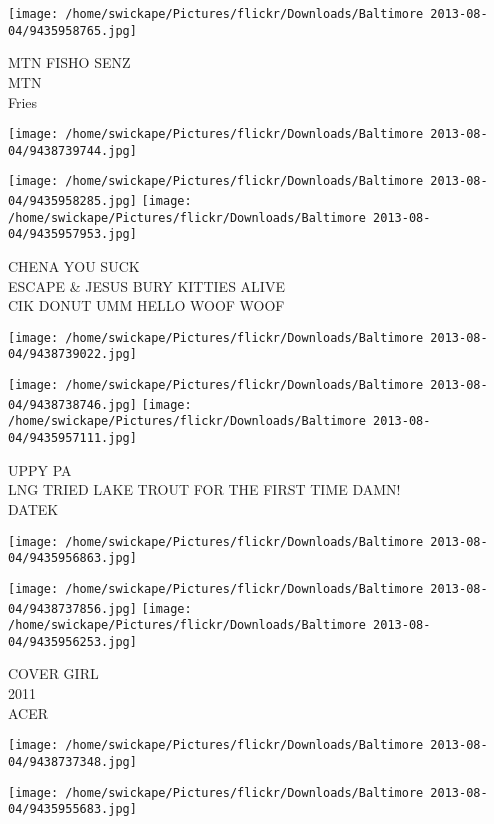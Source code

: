\documentclass[10pt,letterpaper]{article}
\begin{document}
\vspace{0.25in}
\texttt{[image: /home/swickape/Pictures/flickr/Downloads/Baltimore 2013-08-04/9435958765.jpg]}

MTN FISHO SENZ\\
MTN\\
Fries
\pagebreak

\texttt{[image: /home/swickape/Pictures/flickr/Downloads/Baltimore 2013-08-04/9438739744.jpg]}

\vspace{0.25in}
\texttt{[image: /home/swickape/Pictures/flickr/Downloads/Baltimore 2013-08-04/9435958285.jpg]}
\texttt{[image: /home/swickape/Pictures/flickr/Downloads/Baltimore 2013-08-04/9435957953.jpg]}

CHENA YOU SUCK\\
ESCAPE \& JESUS BURY KITTIES ALIVE\\
CIK DONUT UMM HELLO WOOF WOOF
\pagebreak

\texttt{[image: /home/swickape/Pictures/flickr/Downloads/Baltimore 2013-08-04/9438739022.jpg]}

\vspace{0.25in}
\texttt{[image: /home/swickape/Pictures/flickr/Downloads/Baltimore 2013-08-04/9438738746.jpg]}
\texttt{[image: /home/swickape/Pictures/flickr/Downloads/Baltimore 2013-08-04/9435957111.jpg]}

UPPY PA\\
LNG TRIED LAKE TROUT FOR THE FIRST TIME DAMN!\\
DATEK
\pagebreak

\texttt{[image: /home/swickape/Pictures/flickr/Downloads/Baltimore 2013-08-04/9435956863.jpg]}

\vspace{0.25in}
\texttt{[image: /home/swickape/Pictures/flickr/Downloads/Baltimore 2013-08-04/9438737856.jpg]}
\texttt{[image: /home/swickape/Pictures/flickr/Downloads/Baltimore 2013-08-04/9435956253.jpg]}

COVER GIRL\\
2011\\
ACER
\pagebreak

\texttt{[image: /home/swickape/Pictures/flickr/Downloads/Baltimore 2013-08-04/9438737348.jpg]}

\vspace{0.25in}
\texttt{[image: /home/swickape/Pictures/flickr/Downloads/Baltimore 2013-08-04/9435955683.jpg]}
\end{document}

